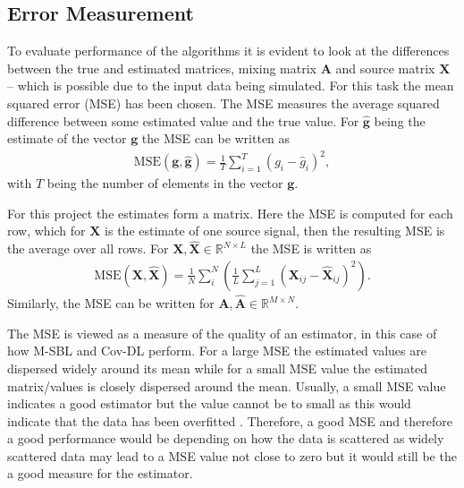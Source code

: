 \subsection{Error Measurement}\label{sec:mse}  
To evaluate performance of the algorithms it is evident to look at the differences between the true and estimated matrices, mixing matrix $\mathbf{A}$ and source matrix $\mathbf{X}$ -- which is possible due to the input data being simulated. 
For this task the mean squared error (MSE) has been chosen. 
The MSE measures the average squared difference between some estimated value and the true value. 
For $\hat{\textbf{g}}$ being the estimate of the vector $\textbf{g}$ the MSE can be written as 
\begin{align*}
\text{MSE}(\textbf{g},\hat{\textbf{g}}) = \frac{1}{T} \sum_{i=1}^T (g_i - \hat{g}_i)^2,  
\end{align*}
with $T$ being the number of elements in the vector $\textbf{g}$. 

For this project the estimates form a matrix. Here the MSE is computed for each row, which for $\mathbf{X}$ is the estimate of one source signal, then the resulting MSE is the average over all rows. 
For $\mathbf{X}, \hat{\mathbf{X}} \in \mathbb{R}^{N \times L}$ the MSE is written as 
\begin{align*}
\text{MSE}(\mathbf{X},\hat{\mathbf{X}}) = \frac{1}{N} \sum_{i}^{N} \left( \frac{1}{L} \sum_{j=1}^L (\mathbf{X}_{ij} - \hat{\mathbf{X}}_{ij})^2\right).  
\end{align*}
Similarly, the MSE can be written for $\mathbf{A},\hat{\mathbf{A}} \in \mathbb{R}^{M \times N}$.  

The MSE is viewed as a measure of the quality of an estimator, in this case of how M-SBL and Cov-DL perform. 
For a large MSE the estimated values are dispersed widely around its mean while for a small MSE value the estimated matrix/values is closely dispersed around the mean. 
Usually, a small MSE value indicates a good estimator but the value cannot be to small as this would indicate that the data has been overfitted . 
Therefore, a good MSE and therefore a good performance would be depending on how the data is scattered as widely scattered data may lead to a MSE value not close to zero but it would still be the a good measure for the estimator.
